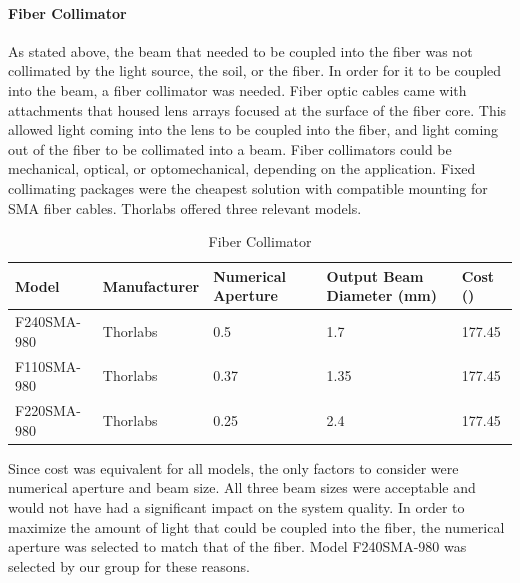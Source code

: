 \paragraph{Fiber Collimator}
As stated above, the beam that needed to be coupled into the fiber was not collimated by the light source, the soil, or the fiber. In order for it to be coupled into the beam, a fiber collimator was needed. Fiber optic cables came with attachments that housed lens arrays focused at the surface of the fiber core. This allowed light coming into the lens to be coupled into the fiber, and light coming out of the fiber to be collimated into a beam. Fiber collimators could be mechanical, optical, or optomechanical, depending on the application. Fixed collimating packages were the cheapest solution with compatible mounting for SMA fiber cables. Thorlabs offered three relevant models.
\begin{table}[H]
	\centering
	\label{table:Fiber Collimator}
	\caption{Fiber Collimator}
	\bigskip
	\begin{tabular}{|p{2cm}|p{2.5cm}|p{2cm}|p{2.75cm}|p{1.75cm}|}
	\hline
	Model & Manufacturer & Numerical Aperture & Output Beam Diameter (mm) & Cost (\textdollar)\\
	\hline
	F240SMA-980 & Thorlabs & 0.5 & 1.7 & 177.45\\
	\hline
	F110SMA-980 & Thorlabs & 0.37 & 1.35 & 177.45\\
	\hline
	F220SMA-980 & Thorlabs & 0.25 & 2.4 & 177.45\\
	\hline
	\end{tabular}
\end{table}
Since cost was equivalent for all models, the only factors to consider were numerical aperture and beam size. All three beam sizes were acceptable and would not have had a significant impact on the system quality. In order to maximize the amount of light that could be coupled into the fiber, the numerical aperture was selected to match that of the fiber. Model F240SMA-980 was selected by our group for these reasons.
